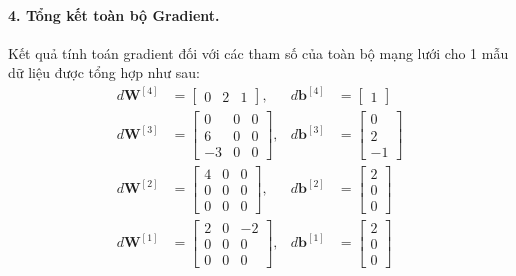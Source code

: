 \paragraph{4. Tổng kết toàn bộ Gradient.\\}
Kết quả tính toán gradient đối với các tham số của toàn bộ mạng lưới cho 1 mẫu dữ liệu được tổng hợp như sau:
\begin{align*}
d\mathbf{W}^{[4]} &= \begin{bmatrix} 0 & 2 & 1 \end{bmatrix}, & d\mathbf{b}^{[4]} &= \begin{bmatrix} 1 \end{bmatrix} \\
d\mathbf{W}^{[3]} &= \begin{bmatrix} 0 & 0 & 0 \\ 6 & 0 & 0 \\ -3 & 0 & 0 \end{bmatrix}, & d\mathbf{b}^{[3]} &= \begin{bmatrix} 0 \\ 2 \\ -1 \end{bmatrix} \\
d\mathbf{W}^{[2]} &= \begin{bmatrix} 4 & 0 & 0 \\ 0 & 0 & 0 \\ 0 & 0 & 0 \end{bmatrix}, & d\mathbf{b}^{[2]} &= \begin{bmatrix} 2 \\ 0 \\ 0 \end{bmatrix} \\
d\mathbf{W}^{[1]} &= \begin{bmatrix} 2 & 0 & -2 \\ 0 & 0 & 0 \\ 0 & 0 & 0 \end{bmatrix}, & d\mathbf{b}^{[1]} &= \begin{bmatrix} 2 \\ 0 \\ 0 \end{bmatrix}
\end{align*}

